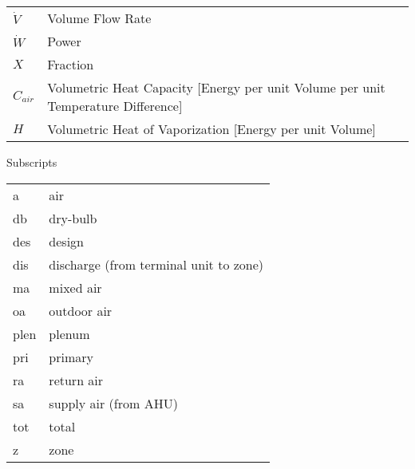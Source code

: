 \begin{longtable}{ll}
\(\dot{V}\) & Volume Flow Rate                                                                  \\
\(\dot{W}\) & Power                                                                             \\
\(X\)       & Fraction                                                                          \\
\(C_{air}\) & \parbox[t]{5in}{Volumetric Heat Capacity [Energy per unit Volume per unit Temperature Difference] } \\
\(H\)       & Volumetric Heat of Vaporization [Energy per unit Volume]                          \\
\end{longtable}


\vspace{2em}

Subscripts

\begin{tabular}{ll}
    a    & air                                    \\
    db   & dry-bulb                               \\
    des  & design                                 \\
    dis  & discharge (from terminal unit to zone) \\
    ma   & mixed air                              \\
    oa   & outdoor air                            \\
    plen & plenum                                 \\
    pri  & primary                                \\
    ra   & return air                             \\
    sa   & supply air (from AHU)                  \\
    tot  & total                                  \\
    z    & zone                                   \\
\end{tabular}


\pagebreak{}
